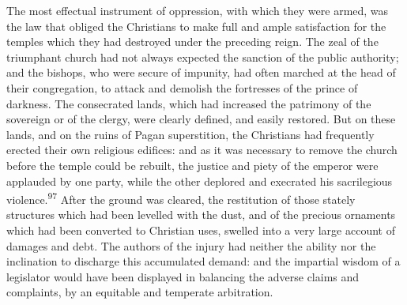 


The most effectual instrument of oppression, with which they were
armed, was the law that obliged the Christians to make full and
ample satisfaction for the temples which they had destroyed under
the preceding reign. The zeal of the triumphant church had not
always expected the sanction of the public authority; and the
bishops, who were secure of impunity, had often marched at the
head of their congregation, to attack and demolish the fortresses
of the prince of darkness. The consecrated lands, which had
increased the patrimony of the sovereign or of the clergy, were
clearly defined, and easily restored. But on these lands, and on
the ruins of Pagan superstition, the Christians had frequently
erected their own religious edifices: and as it was necessary to
remove the church before the temple could be rebuilt, the justice
and piety of the emperor were applauded by one party, while the
other deplored and execrated his sacrilegious violence.\textsuperscript{97} After
the ground was cleared, the restitution of those stately
structures which had been levelled with the dust, and of the
precious ornaments which had been converted to Christian uses,
swelled into a very large account of damages and debt. The
authors of the injury had neither the ability nor the inclination
to discharge this accumulated demand: and the impartial wisdom of
a legislator would have been displayed in balancing the adverse
claims and complaints, by an equitable and temperate arbitration.

